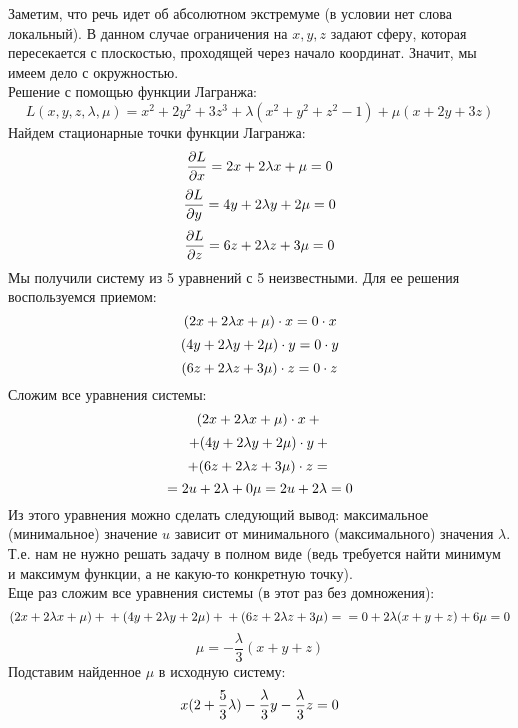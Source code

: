 \begin{solution}
    Заметим, что речь идет об абсолютном экстремуме (в условии нет слова локальный). 
    В данном случае ограничения на $x, y, z$ задают сферу, которая пересекается с плоскостью, проходящей через начало координат. Значит, мы имеем дело с окружностью. \\
    Решение с помощью функции Лагранжа:
    \[ 
        L(x, y, z, \lambda, \mu) = x^2+2y^2+3z^3+\lambda(x^2+y^2+z^2-1)+\mu(x+2y+3z)
    \]
    Найдем стационарные точки функции Лагранжа$\colon$
    \[
        \frac{\partial L}{\partial x} = 2x+2\lambda x + \mu =0
    \]
    \[
        \frac{\partial L}{\partial y} = 4y+2\lambda y + 2\mu=0\\
    \]
    \[
        \frac{\partial L}{\partial z} = 6z+2\lambda z + 3\mu=0\\
    \] 
    Мы получили систему из 5 уравнений с 5 неизвестными. Для ее решения воспользуемся приемом:
    \[
        (2x+2\lambda x + \mu) \cdot x =0 \cdot x\\
    \]
    \[
        (4y+2\lambda y + 2\mu) \cdot y=0 \cdot y\\
    \]
    \[
        (6z+2\lambda z + 3\mu) \cdot z=0 \cdot z\\
    \] 
    Сложим все уравнения системы:
    \[
        (2x+2\lambda x + \mu) \cdot x + \\
    \]
    \[
        + (4y+2\lambda y + 2\mu) \cdot y + \\
    \]
    \[
        + (6z+2\lambda z + 3\mu) \cdot z=\\
    \]
    \[
        = 2u + 2\lambda + 0\mu = 2u + 2\lambda = 0\\
    \]
    Из этого уравнения можно сделать следующий вывод: максимальное (минимальное) значение $u$ зависит от минимального (максимального) значения $\lambda$. Т.е. нам не нужно решать задачу в полном виде (ведь требуется найти минимум и максимум функции, а не какую-то конкретную точку).\\
    Еще раз сложим все уравнения системы (в этот раз без домножения):
    \[
        (2x+2\lambda x + \mu) + \\
        + (4y+2\lambda y + 2\mu) + \\
        + (6z+2\lambda z + 3\mu)=\\
        = 0 + 2\lambda (x+y+z) +6\mu=0\\
    \]
    \[
        \mu = -\frac{\lambda}{3} (x+y+z)
    \]
     Подставим найденное $\mu$ в исходную систему:
     \[
        x(2+\frac{5}{3}\lambda)-\frac{\lambda}{3}y-\frac{\lambda}{3}z=0\\
\]
\end{solution}
